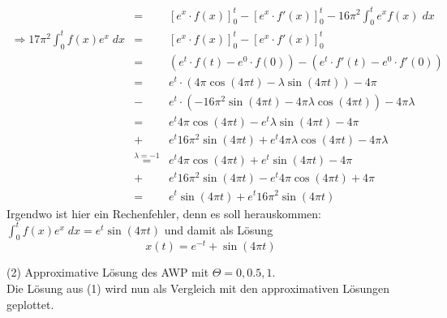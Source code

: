 \documentclass[11pt,a4paper,ngerman]{article}
\begin{document}
\begin{description}
\begin{eqnarray*}
&=& [e^{x} \cdot f(x)]_0^t - [e^{x} \cdot f'(x)]_0^t - 16 \pi^2 \int_0^t e^x f(x) \; dx \\
\Rightarrow 17 \pi^2 \int_0^t f(x)e^{x} \; dx &=& [e^{x} \cdot f(x)]_0^t - [e^{x} \cdot f'(x)]_0^t \\
&=& (e^t \cdot f(t) -  e^0 \cdot f(0)) - (e^t \cdot f'(t) -  e^0 \cdot f'(0)) \\
&=& e^t \cdot (4\pi \cos(4\pi t) - \lambda \sin(4\pi t)) - 4 \pi \\
&-& e^t \cdot (-16 \pi^2 \sin(4 \pi t) - 4 \pi \lambda \cos(4 \pi t)) - 4\pi \lambda \\
&=& e^t 4\pi \cos(4\pi t) - e^t \lambda \sin(4\pi t) - 4\pi \\
&+& e^t 16 \pi^2 \sin(4 \pi t) + e^t 4 \pi \lambda \cos(4 \pi t) - 4\pi \lambda \\
&\stackrel{\lambda = -1}{=}& e^t 4\pi \cos(4\pi t) + e^t \sin(4 \pi t) - 4\pi \\\
&+& e^t 16 \pi^2 \sin(4 \pi t) - e^t 4 \pi \cos(4 \pi t) + 4 \pi \\
&=& e^t \sin(4 \pi t) + e^t 16 \pi^2 \sin(4 \pi t)
\end{eqnarray*}
Irgendwo ist hier ein Rechenfehler, denn es soll herauskommen:
$ \int_0^t f(x)e^{x} \; dx = e^{t} \sin(4\pi t) $ und damit als Lösung
$$ x(t) = e^{-t} + \sin(4\pi t) $$

(2) Approximative Lösung des AWP mit $\Theta = 0, 0.5, 1$. \\
Die Lösung aus (1) wird nun als Vergleich mit den approximativen Lösungen geplottet.


\end{description}
\end{document}
